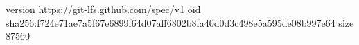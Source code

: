 version https://git-lfs.github.com/spec/v1
oid sha256:f724e71ae7a5f67e6899f64d07aff6802b8fa40d0d3c498e5a595de08b997e64
size 87560
